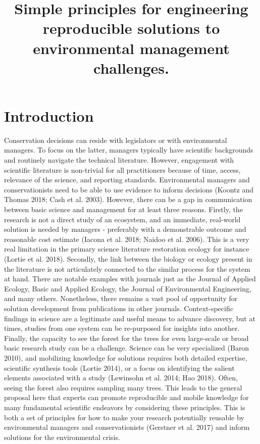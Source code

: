 \documentclass[fleqn,10pt]{wlpeerj} %
\title{Simple principles for engineering reproducible solutions to
environmental management challenges.}
\author[]{}
\begin{document}
\flushbottom
\maketitle
\thispagestyle{empty}

\section*{Introduction}\label{introduction}

Conservation decisions can reside with legislators or with environmental
managers. To focus on the latter, managers typically have scientific
backgrounds and routinely navigate the technical literature. However,
engagement with scientific literature is non-trivial for all
practitioners because of time, access, relevance of the science, and
reporting standards. Environmental managers and conservationists need to
be able to use evidence to inform decisions (Koontz and Thomas 2018;
Cash et al. 2003). However, there can be a gap in communication between
basic science and management for at least three reasons. Firstly, the
research is not a direct study of an ecosystem, and an immediate,
real-world solution is needed by managers - preferably with a
demonstrable outcome and reasonable cost estimate (Iacona et al. 2018;
Naidoo et al. 2006). This is a very real limitation in the primary
science literature restoration ecology for instance (Lortie et al.
2018). Secondly, the link between the biology or ecology present in the
literature is not articulately connected to the similar process for the
system at hand. There are notable examples with journals just as the
Journal of Applied Ecology, Basic and Applied Ecology, the Journal of
Environmental Engineering, and many others. Nonetheless, there remains a
vast pool of opportunity for solution development from publications in
other journals. Context-specific findings in science are a legitimate
and useful means to advance discovery, but at times, studies from one
system can be re-purposed for insights into another. Finally, the
capacity to see the forest for the trees for even large-scale or broad
basic research study can be a challenge. Science can be very specialized
(Baron 2010), and mobilizing knowledge for solutions requires both
detailed expertise, scientific synthesis tools (Lortie 2014), or a focus
on identifying the salient elements associated with a study (Lewinsohn
et al. 2014; Hao 2018). Often, seeing the forest also requires sampling
many trees. This leads to the general proposal here that experts can
promote reproducible and mobile knowledge for many fundamental
scientific endeavors by considering these principles. This is both a set
of principles for how to make your research potentially reusable by
environmental managers and conservationists (Gerstner et al. 2017) and
inform solutions for the environmental crisis.
\end{document}

